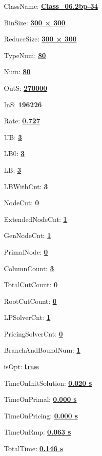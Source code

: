 \documentclass[11pt]{article}
\begin{document}
\pagestyle{empty}


ClassName: \underline{\textbf{Class_06.2bp-34}}
\par
BinSize: \underline{\textbf{300 × 300}}
\par
ReduceSize: \underline{\textbf{300 × 300}}
\par
TypeNum: \underline{\textbf{80}}
\par
Num: \underline{\textbf{80}}
\par
OutS: \underline{\textbf{270000}}
\par
InS: \underline{\textbf{196226}}
\par
Rate: \underline{\textbf{0.727}}
\par
UB: \underline{\textbf{3}}
\par
LB0: \underline{\textbf{3}}
\par
LB: \underline{\textbf{3}}
\par
LBWithCut: \underline{\textbf{3}}
\par
NodeCut: \underline{\textbf{0}}
\par
ExtendedNodeCnt: \underline{\textbf{1}}
\par
GenNodeCnt: \underline{\textbf{1}}
\par
PrimalNode: \underline{\textbf{0}}
\par
ColumnCount: \underline{\textbf{3}}
\par
TotalCutCount: \underline{\textbf{0}}
\par
RootCutCount: \underline{\textbf{0}}
\par
LPSolverCnt: \underline{\textbf{1}}
\par
PricingSolverCnt: \underline{\textbf{0}}
\par
BranchAndBoundNum: \underline{\textbf{1}}
\par
isOpt: \underline{\textbf{true}}
\par
TimeOnInitSolution: \underline{\textbf{0.020 s}}
\par
TimeOnPrimal: \underline{\textbf{0.000 s}}
\par
TimeOnPricing: \underline{\textbf{0.000 s}}
\par
TimeOnRmp: \underline{\textbf{0.063 s}}
\par
TotalTime: \underline{\textbf{0.146 s}}
\par
\newpage
\end{document}
